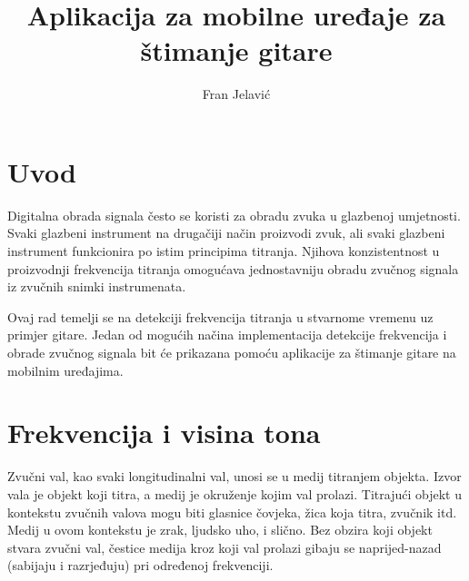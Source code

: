 \documentclass[times, utf8, zavrsni, numeric]{fer}
\begin{document}

\title{Aplikacija za mobilne uređaje za štimanje gitare}

\author{Fran Jelavić}

\maketitle



\zahvala{}

\tableofcontents

\chapter{Uvod}
Digitalna obrada signala često se koristi za obradu zvuka u glazbenoj umjetnosti. Svaki glazbeni instrument na drugačiji način proizvodi zvuk, ali svaki glazbeni instrument funkcionira po istim principima titranja.
Njihova konzistentnost u proizvodnji frekvencija titranja omogućava jednostavniju obradu zvučnog signala iz zvučnih snimki instrumenata. 

Ovaj rad temelji se na detekciji frekvencija titranja u stvarnome vremenu uz primjer gitare. Jedan od mogućih načina implementacija detekcije frekvencija i obrade zvučnog signala bit će prikazana pomoću aplikacije za štimanje gitare na mobilnim uređajima.

%

\chapter{Frekvencija i visina tona}
Zvučni val, kao svaki longitudinalni val, unosi se u medij titranjem objekta. Izvor vala je objekt koji titra, a medij je okruženje kojim val prolazi. Titrajući objekt u kontekstu zvučnih valova mogu biti glasnice čovjeka, žica koja titra, zvučnik itd. Medij u ovom kontekstu je zrak, ljudsko uho, i slično. Bez obzira koji objekt stvara zvučni val, čestice medija kroz koji val prolazi gibaju se naprijed-nazad (sabijaju i razrjeđuju) pri određenoj frekvenciji.
\end{document}
